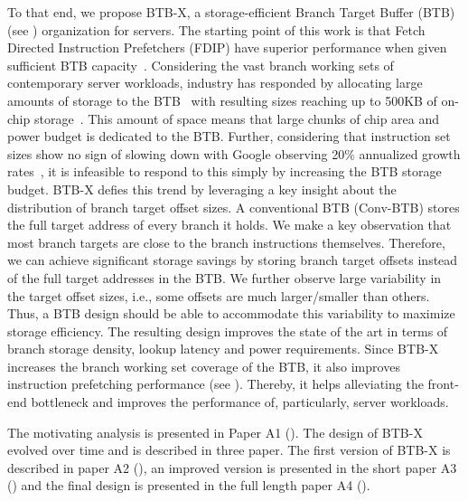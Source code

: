 \documentclass[../main.tex]{subfiles}
\begin{document}
\begin{refsection}
To that end, we propose BTB-X, a storage-efficient Branch Target
Buffer (BTB) (see ) organization for servers.
The starting point of this work is that Fetch Directed Instruction
Prefetchers (FDIP) have superior performance when given sufficient BTB
capacity~\cite{ishii21_re_fetch_direc_instr_prefet}. Considering the
vast branch working sets of contemporary server workloads, industry
has responded by allocating large amounts of storage to the
BTB~\cite{neoverse,IBMz,zen2} with resulting sizes reaching up to
500KB of on-chip storage~\cite{exynos}. This amount of space means
that large chunks of chip area and power budget is dedicated to the
BTB. Further, considering that instruction set sizes show no sign of
slowing down with Google observing 20\% annualized growth
rates~\cite{kanev15_profil}, it is infeasible to respond to this
simply by increasing the BTB storage budget. BTB-X defies this trend
by leveraging a key insight about the distribution of branch target
offset sizes. A conventional BTB (Conv-BTB) stores the full target
address of every branch it holds. We make a key observation that most
branch targets are close to the branch instructions
themselves. Therefore, we can achieve significant storage savings by
storing branch target offsets instead of the full target addresses in
the BTB. We further observe large variability in the target offset
sizes, i.e., some offsets are much larger/smaller than others. Thus, a
BTB design should be able to accommodate this variability to maximize
storage efficiency. The resulting design improves the state of the art
in terms of branch storage density, lookup latency and power
requirements. Since BTB-X increases the branch working set coverage of
the BTB, it also improves instruction prefetching performance (see
). Thereby, it helps alleviating the
front-end bottleneck and improves the performance of, particularly,
server workloads.

The motivating analysis is presented in Paper A1 ().
The design of BTB-X evolved over time and is described in three paper. The first version of BTB-X is described in paper A2
(), an improved version is presented in the
short paper A3 () and the final design is
presented in the full length paper A4 ().


\end{refsection}
\end{document}
